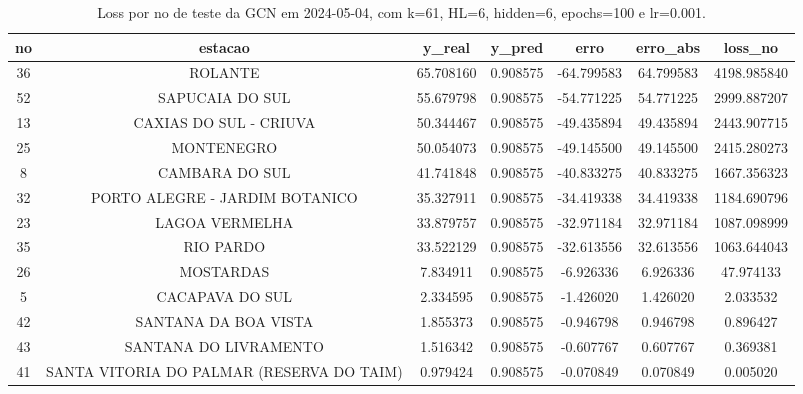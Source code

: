 \begin{table}[h]
\centering
\caption{Loss por no de teste da GCN em 2024-05-04, com k=61, HL=6, hidden=6, epochs=100 e lr=0.001.}
\label{tab:gcn_loss_k61_hl6_h6_e100_d20240504}
\begin{tabular}{ccccccc}
\toprule
no & estacao & y\_real & y\_pred & erro & erro\_abs & loss\_no \\
\midrule
36 & ROLANTE & 65.708160 & 0.908575 & -64.799583 & 64.799583 & 4198.985840 \\
52 & SAPUCAIA DO SUL & 55.679798 & 0.908575 & -54.771225 & 54.771225 & 2999.887207 \\
13 & CAXIAS DO SUL - CRIUVA & 50.344467 & 0.908575 & -49.435894 & 49.435894 & 2443.907715 \\
25 & MONTENEGRO & 50.054073 & 0.908575 & -49.145500 & 49.145500 & 2415.280273 \\
8 & CAMBARA DO SUL & 41.741848 & 0.908575 & -40.833275 & 40.833275 & 1667.356323 \\
32 & PORTO ALEGRE - JARDIM BOTANICO & 35.327911 & 0.908575 & -34.419338 & 34.419338 & 1184.690796 \\
23 & LAGOA VERMELHA & 33.879757 & 0.908575 & -32.971184 & 32.971184 & 1087.098999 \\
35 & RIO PARDO & 33.522129 & 0.908575 & -32.613556 & 32.613556 & 1063.644043 \\
26 & MOSTARDAS & 7.834911 & 0.908575 & -6.926336 & 6.926336 & 47.974133 \\
5 & CACAPAVA DO SUL & 2.334595 & 0.908575 & -1.426020 & 1.426020 & 2.033532 \\
42 & SANTANA DA BOA VISTA & 1.855373 & 0.908575 & -0.946798 & 0.946798 & 0.896427 \\
43 & SANTANA DO LIVRAMENTO & 1.516342 & 0.908575 & -0.607767 & 0.607767 & 0.369381 \\
41 & SANTA VITORIA DO PALMAR (RESERVA DO TAIM) & 0.979424 & 0.908575 & -0.070849 & 0.070849 & 0.005020 \\
\bottomrule
\end{tabular}
\end{table}
